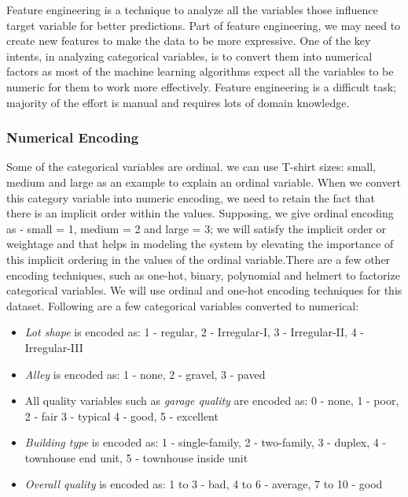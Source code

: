 \documentclass[sigconf]{acmart}
\begin{document}
	Feature engineering is a technique to analyze all the variables those influence target variable for better predictions. Part of feature engineering, we may need to create new features to make the data to be more expressive. One of the key intents, in analyzing categorical variables, is to convert them into numerical factors as most of the machine learning algorithms expect all the variables to be numeric for them to work more effectively. Feature engineering is a difficult task; majority of the effort is manual and requires lots of domain knowledge.
	
	\subsubsection{Numerical Encoding}
	Some of the categorical variables are ordinal. we can use T-shirt sizes: small, medium and large as an example to explain an ordinal variable. When we convert this category variable into numeric encoding, we need to retain the fact that there is an implicit order within the values. Supposing, we give ordinal encoding as - small = 1, medium = 2 and large = 3; we will satisfy the implicit order or weightage and that helps in modeling the system by elevating the importance of this implicit ordering in the values of the ordinal variable.There are a few other encoding techniques, such as one-hot, binary, polynomial and helmert to factorize categorical variables. We will use ordinal and one-hot encoding techniques for this dataset. Following are a few categorical variables converted to numerical:
	
	\begin{itemize}
		\item {\em Lot shape} is encoded as: 1 - regular, 2 - Irregular-I, 3 - Irregular-II, 4 - Irregular-III
		\item {\em Alley} is encoded as: 1 - none, 2 - gravel, 3 - paved
		\item All quality variables such as {\em garage quality} are encoded as: 0 - none, 1 - poor, 2 - fair 3 - typical 4 - good, 5 - excellent
		\item {\em Building type} is encoded as: 1 - single-family, 2 - two-family, 3 - duplex, 4 - townhouse end unit, 5 - townhouse inside unit
		\item {\em Overall quality} is encoded as: 1 to 3 - bad, 4 to 6 - average, 7 to 10 - good		 
		
	\end{itemize}
	
\end{document}
